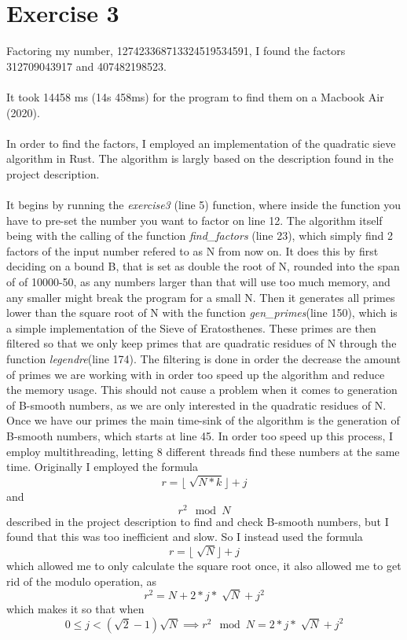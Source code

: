 \documentclass[12pt]{article}
\begin{document}
\section*{Exercise 3}
Factoring my number, 127423368713324519534591, I found the factors 312709043917 and 407482198523.
\\\\
It took 14458 ms (14s 458ms) for the program to find them on a Macbook Air (2020).
\\\\
In order to find the factors, I employed an implementation of the quadratic sieve algorithm\cite{wiki:quadraticsieve} in Rust. 
The algorithm is largly based on the description found in the project description.
\\\\
It begins by running the \textit{exercise3} (line 5) function, where inside the function you have to pre-set the number you want to factor on line 12.
The algorithm itself being with the calling of the function \textit{find\_factors} (line 23), which simply find 2 factors of the input number refered to as N from now on.
It does this by first deciding on a bound B, that is set as double the root of N, rounded into the span of of 10000-50, as any numbers larger than that will use too much memory, and any smaller might break the program for a small N.
Then it generates all primes lower than the square root of N with the function \textit{gen\_primes}(line 150), which is a simple implementation of the Sieve of Eratosthenes\cite{wiki:Eratosthenes}. These primes are then filtered so that we only keep primes that are quadratic residues of N through the function \textit{legendre}(line 174).
The filtering is done in order the decrease the amount of primes we are working with in order too speed up the algorithm and reduce the memory usage. This should not cause a problem when it comes to generation of B-smooth numbers, as we are only interested in the quadratic residues of N.\cite{wiki:quadraticsieve}
\\
Once we have our primes the main time-sink of the algorithm is the generation of B-smooth numbers, which starts at line 45.
In order too speed up this process, I employ multithreading, letting 8 different threads find these numbers at the same time.
Originally I employed the formula \[ r = \lfloor\sqrt[]{N*k}\rfloor + j \] and \[ r^2 \mod N \] described in the project description to find and check B-smooth numbers, but I found that this was too inefficient and slow. 
So I instead used the formula \[ r = \lfloor\sqrt[]N\rfloor + j \] which allowed me to only calculate the square root once, it also allowed me to get rid of the modulo operation, as \[r^2 = N + 2*j*\sqrt[]N + j^2\] which makes it so that when \[0 \leq  j < (\sqrt{2} - 1)\sqrt{N} \implies r^2\mod N = 2*j*\sqrt[]N + j^2 \]
\end{document}
